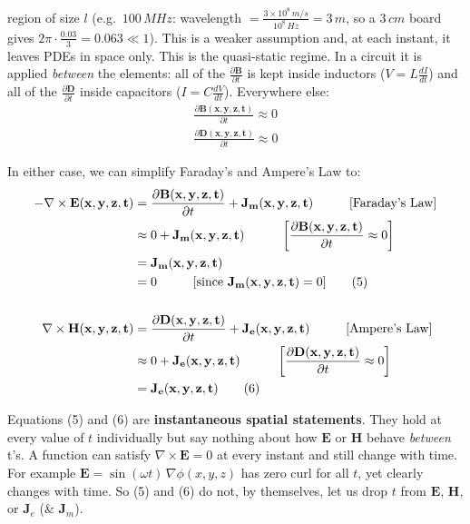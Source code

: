 \begin{enumerate}
    region of size \(l\) (e.g.\ \(100\,MHz\): wavelength \(= \frac{3 \times 10^{8}\,m/s}{10^{8}\,Hz} = 3\,m\), so a
    \(3\,cm\) board gives \(2\pi \cdot \frac{0.03}{3} = 0.063 \ll 1\)). This is a weaker assumption and,
    at each instant, it leaves PDEs in space only. This is the quasi-static
    regime. In a circuit it is applied \emph{between} the elements: all of the
    \(\frac{\partial \mathbf{B}}{\partial t}\) is kept inside inductors (\(V = L\frac{dI}{dt}\)) and all of the
    \(\frac{\partial \mathbf{D}}{\partial t}\) inside capacitors (\(I = C\frac{dV}{dt}\)). Everywhere else:
    \begin{align*}
      \frac{\partial \mathbf{B(x,y,z,t)}}{\partial t} \approx 0 \\
      \frac{\partial \mathbf{D(x,y,z,t)}}{\partial t} \approx 0
    \end{align*}
\end{enumerate}
In either case, we can simplify Faraday's and Ampere's Law to:
\begin{align*}
    -\nabla \times \mathbf{E(x,y,z,t)} &= \frac{\partial \mathbf{B(x,y,z,t)}}{\partial t} + \mathbf{J_m(x,y,z,t)} \hspace{1cm} \text{[Faraday's Law]} \\
                                       &\approx 0 + \mathbf{J_m(x,y,z,t)} \hspace{1cm} \left[\frac{\partial \mathbf{B(x,y,z,t)}}{\partial t} \approx 0\right] \\
                                       &= \mathbf{J_m(x,y,z,t)} \\
     &= 0  \hspace{1cm} \text{[since \( \mathbf{J_m(x,y,z,t)} = 0 \)]} \tag{5} \\\\
    \nabla \times \mathbf{H(x,y,z,t)} &= \frac{\partial \mathbf{D(x,y,z,t)}}{\partial t} + \mathbf{J_e(x,y,z,t)} \hspace{1cm} \text{[Ampere's Law]} \\
                                      &\approx 0 + \mathbf{J_e(x,y,z,t)} \hspace{1cm} \left[\frac{\partial \mathbf{D(x,y,z,t)}}{\partial t} \approx 0\right] \\
                                      &= \mathbf{J_e(x,y,z,t)} \tag{6}
\end{align*}

Equations (5) and (6) are \textbf{instantaneous spatial statements}. They hold at every
value of \(t\) individually but say nothing about how \(\mathbf{E}\) or \(\mathbf{H}\)
behave \emph{between} t's. A function can satisfy \(\nabla\times\mathbf{E}=0\) at
every instant and still change with time. For example \(\mathbf{E} = \sin(\omega t)\,
\nabla\phi(x,y,z)\) has zero curl for all \(t\), yet clearly changes with time. So (5)
and (6) do not, by themselves, let us drop \(t\) from \(\mathbf{E}\), \(\mathbf{H}\),
or \(\mathbf{J}_e\) (\& \(\mathbf{J}_m\)).

